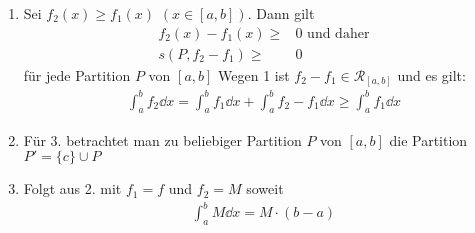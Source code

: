 \begin{Satz}
{\begin{enumerate}
\begin{align*}
		\end{align*}				
		Analog gilt: 
		\begin{align*}
			\inf_{x \in [x_{i-1}-x_i]} f_1(x) + f_2(x) \geq & 
			\inf_{x \in [x_{i-1}-x_i]} f_1(x) + \inf_{x \in [x_{i-1}-x_i]} f_2(x)
		\end{align*}				
		Damit folgt:
		\begin{align*}
			s(P,f_1) + s(P,f_2) \leq s(P,f_1 +f_2) \leq S(P,f_1 + f_2) 
			\leq S(P,f_1) + S(P,f_2)
		\end{align*}
		Also gilt:
		\begin{align*}
			S(P, f_1 + f_2) - s(P, f_1 +f_2) & \\
			\leq &  S(P, f_1) - s(P,f_1) + S(P,f_2) 
			-s(P,f_2) \leq 2 \epsilon
		\end{align*}
		Da $\epsilon >0 $ beliebig gewählt war, gilt $f_1 + f_2 \in 
		\mathcal{R}_{[a,b]}$ nach Satz~\ref{kap_10_satz18}. \\
		Weiter gilt: 
		\begin{align*}
			s(P, f_1 +f_2), S(P, f_1 + f_2) \in &
			[s(P,f_1) - s(P,f_2), S(P,f_1) + S(P,f_2)] \\
			\subseteq 
			& \left[ \int_a^b f_1 \dd{x} + \int_a^b f_2\dd{x} + 2\epsilon \right]
		\end{align*}
		Da $\epsilon > 0$ beliebig gewählt wurde, gilt:
		\begin{align*}
			\int_a^b f_1 + f_2 \dd{x}  = \int_a^b f_1\dd{x} + \int_a^b f_2 \dd{x}
		\end{align*}
		Die Aussage bezüglich  $c \cdot f$ zeigt man analog.
		\item Sei $f_2(x) \geq f_1(x)$ $(x \in [a,b])$. Dann gilt
		\begin{align*}		
			f_2(x) - f_1(x) \geq & 0 \text{ und daher} \\
			s(P, f_2 -f_1) \geq & 0
		\end{align*} 
		 für jede Partition $P$ von $[a,b]$ 
		Wegen 1 ist $f_2 -f_1 \in \mathcal{R}_{[a,b]}$ und es gilt:
		\begin{align*}
			\int_a^b f_2 \dd{x} = \int_a^b f_1 \dd{x} + \int_a^bf_2-f_1 \dd{x} 
			\geq \int_a^b f_1 \dd{x}
	\end{align*}		 
	\item Für 3. betrachtet man zu beliebiger Partition $P$ von $[a,b]$ die Partition \linebreak
	$P' = \{c\} \cup P$
	\item Folgt aus 2. mit $f_1 = f$ und $f_2 = M$ soweit 
	\begin{align*}
		\int_a^b M \dd{x} = M \cdot (b-a)
	\end{align*}		
	\end{enumerate}
}\end{Satz}


